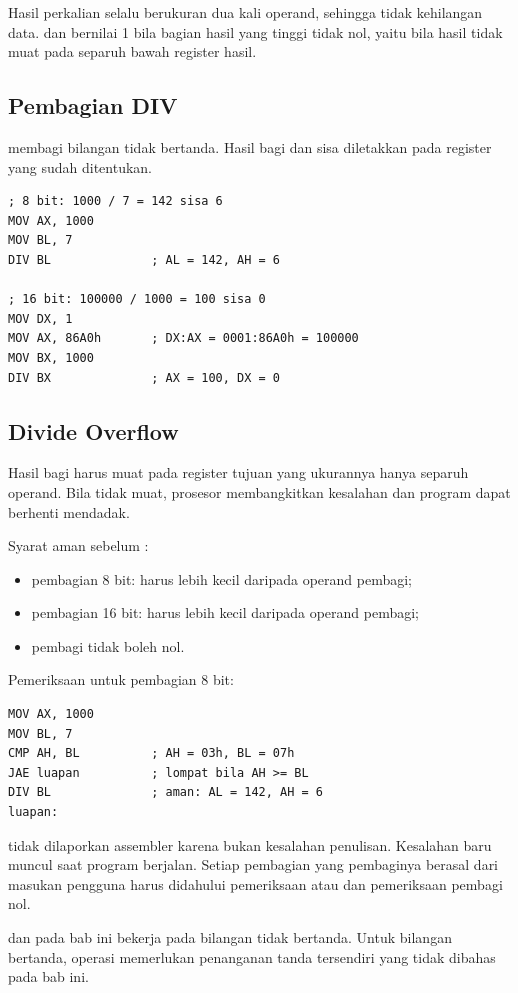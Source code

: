 Hasil perkalian selalu berukuran dua kali operand, sehingga 
tidak kehilangan data.  dan  bernilai 1 bila bagian
hasil yang tinggi tidak nol, yaitu bila hasil tidak muat pada
separuh bawah register hasil.

\subsection{Pembagian DIV}

 membagi bilangan tidak bertanda. Hasil bagi dan sisa
diletakkan pada register yang sudah ditentukan.

\begin{lstlisting}[language=MASM, numbers=none]
; 8 bit: 1000 / 7 = 142 sisa 6
MOV AX, 1000
MOV BL, 7
DIV BL              ; AL = 142, AH = 6

; 16 bit: 100000 / 1000 = 100 sisa 0
MOV DX, 1
MOV AX, 86A0h       ; DX:AX = 0001:86A0h = 100000
MOV BX, 1000
DIV BX              ; AX = 100, DX = 0
\end{lstlisting}

\subsection{Divide Overflow}

Hasil bagi harus muat pada register tujuan yang ukurannya hanya
separuh operand. Bila tidak muat, prosesor membangkitkan kesalahan
 dan program dapat berhenti mendadak.

Syarat aman sebelum :

\begin{itemize}
    \item pembagian 8 bit:  harus lebih kecil daripada
          operand pembagi;
    \item pembagian 16 bit:  harus lebih kecil daripada
          operand pembagi;
    \item pembagi tidak boleh nol.
\end{itemize}

Pemeriksaan untuk pembagian 8 bit:

\begin{lstlisting}[language=MASM, numbers=none]
MOV AX, 1000
MOV BL, 7
CMP AH, BL          ; AH = 03h, BL = 07h
JAE luapan          ; lompat bila AH >= BL
DIV BL              ; aman: AL = 142, AH = 6
luapan:
\end{lstlisting}

\begin{peringatanbox}
\vspace{1.1em}
 tidak dilaporkan assembler karena bukan
kesalahan penulisan. Kesalahan baru muncul saat program berjalan.
Setiap pembagian yang pembaginya berasal dari masukan pengguna harus
didahului pemeriksaan  atau  dan pemeriksaan pembagi
nol.
\end{peringatanbox}

\begin{infobox}
\vspace{1.1em}
 dan  pada bab ini bekerja pada bilangan tidak
bertanda. Untuk bilangan bertanda, operasi memerlukan penanganan
tanda tersendiri yang tidak dibahas pada bab ini.
\end{infobox}

